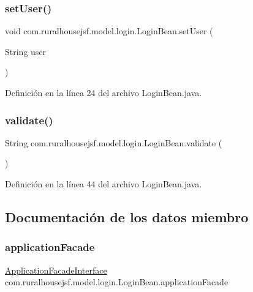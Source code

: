 \subsubsection{\texorpdfstring{setUser()}{setUser()}}
{\footnotesize\ttfamily void com.\+ruralhousejsf.\+model.\+login.\+Login\+Bean.\+set\+User (\begin{DoxyParamCaption}\item[{String}]{user }\end{DoxyParamCaption})}



Definición en la línea 24 del archivo Login\+Bean.\+java.

\mbox{\label{classcom_1_1ruralhousejsf_1_1model_1_1login_1_1_login_bean_ac3b4153fa4416dc62d107ae2005a9ee8}} 
\subsubsection{\texorpdfstring{validate()}{validate()}}
{\footnotesize\ttfamily String com.\+ruralhousejsf.\+model.\+login.\+Login\+Bean.\+validate (\begin{DoxyParamCaption}{ }\end{DoxyParamCaption})}



Definición en la línea 44 del archivo Login\+Bean.\+java.



\subsection{Documentación de los datos miembro}
\mbox{\label{classcom_1_1ruralhousejsf_1_1model_1_1login_1_1_login_bean_aba818fddb0e4c1e484f5a336e9cedd40}} 
\subsubsection{\texorpdfstring{applicationFacade}{applicationFacade}}
{\footnotesize\ttfamily \mbox{\hyperlink{interfacecom_1_1ruralhousejsf_1_1business_logic_1_1_application_facade_interface}{Application\+Facade\+Interface}} com.\+ruralhousejsf.\+model.\+login.\+Login\+Bean.\+application\+Facade\hspace{0.3cm}{\ttfamily [private]}}



